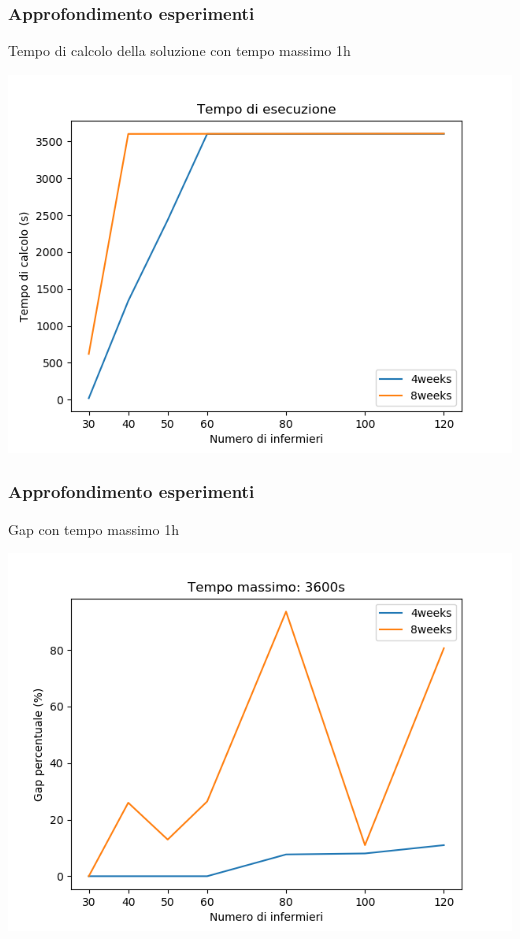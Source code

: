 \documentclass[xcolor={dvipsnames, table}]{beamer}
\begin{document}
\begin{frame}[noframenumbering]
\frametitle{Approfondimento esperimenti}
Tempo di calcolo della soluzione con tempo massimo 1h
\begin{center}
\includegraphics[scale=0.5]{img/Problema4/Time_1h-h1_w4.png}
\end{center}
\end{frame}

\begin{frame}[noframenumbering]
\frametitle{Approfondimento esperimenti}
Gap con tempo massimo 1h
\begin{center}
\includegraphics[scale=0.5]{img/Problema2/Gap_1h-h0_w4.png}
\end{center}
\end{frame}
\end{document}
